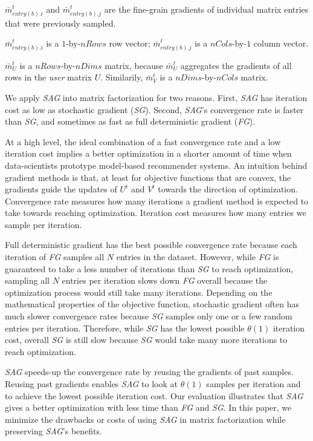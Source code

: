 $\bar{m}_{entry(b).i}^{t}$ and $\bar{m}_{entry(b).j}^{t}$ are the fine-grain gradients of individual matrix entries that were previously sampled.  

$\bar{m}_{entry(b).i}^{t}$ is a $1$-by-$nRows$ row vector;
$\bar{m}_{entry(b).j}^{t}$ is a $nCols$-by-$1$ column vector.

$\bar{m}_{U}^{t}$ is a $nRows$-by-$nDims$ matrix, because $\bar{m}_{U}^{t}$ aggregates the gradients of all rows in the \emph{user} matrix $U$.
Similarily, $\bar{m}_{V}^{t}$ is a $nDims$-by-$nCols$ matrix.

We apply \emph{SAG} into matrix factorization for two reasons.  
First, \emph{SAG} has iteration cost as low as stochastic gradient (\emph{SG}).
Second, \emph{SAG}'s convergence rate is faster than \emph{SG}, and sometimes as fast as full deterministic gradient (\emph{FG}).

At a high level, the ideal combination of a fast convergence rate and a low iteration cost implies a better optimization in a shorter amount of time when data-scientists prototype model-based recommender systems.
An intuition behind gradient methods is that, at least for objective functions that are convex, the gradients guide the updates of $U^t$ and $V^t$ towards the direction of optimization.  
Convergence rate measures how many iterations a gradient method is expected to take towards reaching optimization. 
Iteration cost measures how many entries we sample per iteration.

Full deterministic gradient has the best possible convergence rate because each iteration of \emph{FG} samples all $N$ entries in the dataset.
However, while \emph{FG} is guaranteed to take a less number of iterations than \emph{SG} to reach optimization, sampling all $N$ entries per iteration slows down \emph{FG} overall because the optimization process would still take many iterations.
Depending on the mathematical properties of the objective function, stochastic gradient often has much slower convergence rates because \emph{SG} samples only one or a few random entries per iteration.
Therefore, while \emph{SG} has the lowest possible $\theta(1)$ iteration cost, overall \emph{SG} is still slow because \emph{SG} would take many more iterations to reach optimization.

\emph{SAG} speeds-up the convergence rate by reusing the gradients of past samples.  
Reusing past gradients enables \emph{SAG} to look at $\theta(1)$ samples per iteration and to achieve the lowest possible iteration cost.  
Our evaluation illustrates that \emph{SAG} gives a better optimization with less time than \emph{FG} and \emph{SG}.  
In this paper, we minimize the drawbacks or costs of using \emph{SAG} in matrix factorization while preserving \emph{SAG}'s benefits.
